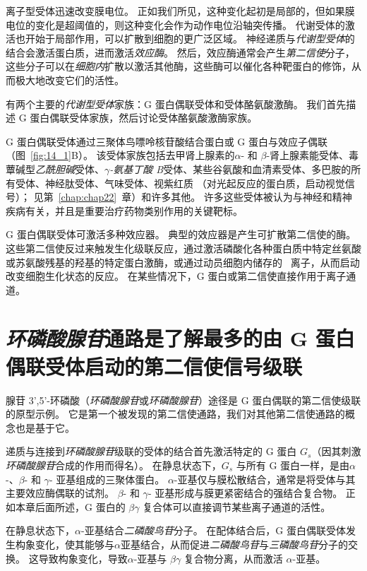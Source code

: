 离子型受体迅速改变膜电位。
正如我们所见，这种变化起初是局部的，但如果膜电位的变化是超阈值的，则这种变化会作为动作电位沿轴突传播。
代谢受体的激活也开始于局部作用，可以扩散到细胞的更广泛区域。
神经递质与\textit{代谢型受体}的结合会激活蛋白质，进而激活\textit{效应酶}。
然后，效应酶通常会产生\textit{第二信使}分子，这些分子可以在\textit{细胞内}扩散以激活其他酶，这些酶可以催化各种靶蛋白的修饰，从而极大地改变它们的活性。


有两个主要的\textit{代谢型受体}家族：G 蛋白偶联受体和受体酪氨酸激酶。
我们首先描述 G 蛋白偶联受体家族，然后讨论受体酪氨酸激酶家族。


G 蛋白偶联受体通过三聚体鸟嘌呤核苷酸结合蛋白或 G 蛋白与效应子偶联（图~\ref{fig:14_1}B）。
该受体家族包括去甲肾上腺素的$\alpha$- 和 $\beta$-肾上腺素能受体、毒蕈碱型\textit{乙酰胆碱}受体、\textit{$\gamma$-氨基丁酸 B}受体、某些谷氨酸和血清素受体、多巴胺的所有受体、神经肽受体、气味受体、视紫红质 （对光起反应的蛋白质，启动视觉信号）；
见第~\ref{chap:chap22}~章）和许多其他。
许多这些受体被认为与神经和精神疾病有关，并且是重要治疗药物类别作用的关键靶标。


G 蛋白偶联受体可激活多种效应器。
典型的效应器是产生可扩散第二信使的酶。
这些第二信使反过来触发生化级联反应，通过激活磷酸化各种蛋白质中特定丝氨酸或苏氨酸残基的羟基的特定蛋白激酶，或通过动员细胞内储存的~ 离子，从而启动改变细胞生化状态的反应。
在某些情况下，G 蛋白或第二信使直接作用于离子通道。



\section{\textit{环磷酸腺苷}通路是了解最多的由 G 蛋白偶联受体启动的第二信使信号级联}

腺苷 3',5'-环磷酸（\textit{环磷酸腺苷}或\textit{环磷酸腺苷}）途径是 G 蛋白偶联的第二信使级联的原型示例。
它是第一个被发现的第二信使通路，我们对其他第二信使通路的概念也是基于它。


递质与连接到\textit{环磷酸腺苷}级联的受体的结合首先激活特定的 G 蛋白 $ G_s $（因其刺激\textit{环磷酸腺苷}合成的作用而得名）。
在静息状态下，$ G_s $ 与所有 G 蛋白一样，是由$\alpha$-、$\beta$- 和 $\gamma$- 亚基组成的三聚体蛋白。
$\alpha$-亚基仅与膜松散结合，通常是将受体与其主要效应酶偶联的试剂。
$\beta$- 和 $\gamma$- 亚基形成与膜更紧密结合的强结合复合物。
正如本章后面所述，G 蛋白的 $\beta \gamma$ 复合体可以直接调节某些离子通道的活性。


在静息状态下，$\alpha$-亚基结合\textit{二磷酸鸟苷}分子。
在配体结合后，G 蛋白偶联受体发生构象变化，使其能够与$\alpha$亚基结合，从而促进\textit{二磷酸鸟苷}与\textit{三磷酸鸟苷}分子的交换。
这导致构象变化，导致$\alpha$-亚基与 $\beta \gamma$ 复合物分离，从而激活 $\alpha$-亚基。


